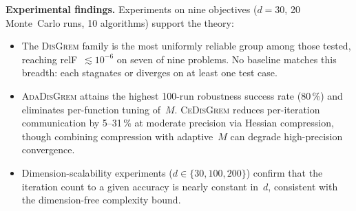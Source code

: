 \documentclass[10pt,twocolumn,letterpaper]{article}
\theoremstyle{compact}
\theoremstyle{compactremark}
\begin{document}
	\noindent\textbf{Experimental findings.}
	Experiments on nine objectives ($d{=}30$, 20 Monte~Carlo runs,
	10 algorithms) support the theory:
	\begin{itemize}[leftmargin=1.2em,itemsep=2pt]
		\item The \textsc{DisGrem} family is the most uniformly reliable
		group among those tested, reaching relF~$\lesssim 10^{-6}$ on seven of
		nine problems. No baseline matches this breadth: each stagnates or
		diverges on at least one test case.
		\item \textsc{AdaDisGrem} attains the highest 100-run robustness
		success rate (80\,\%) and eliminates per-function tuning of~$M$.
		\textsc{CeDisGrem} reduces per-iteration communication by 5--31\,\%
		at moderate precision via Hessian compression, though combining
		compression with adaptive~$M$ can degrade high-precision convergence.
		\item Dimension-scalability experiments ($d\in\{30,100,200\}$)
		confirm that the iteration count to a given accuracy is nearly
		constant in~$d$, consistent with the dimension-free complexity bound.
	\end{itemize}
	
\end{document}
